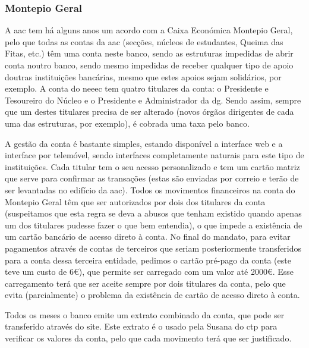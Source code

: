 
\subsubsection{Montepio Geral}

A \acrshort{aac} tem há alguns anos um acordo com a Caixa Económica Montepio Geral, pelo que todas as contas da \acrshort{aac} (secções, núcleos de estudantes, Queima das Fitas, etc.) têm uma conta neste banco, sendo as estruturas impedidas de abrir conta noutro banco, sendo mesmo impedidas de receber qualquer tipo de apoio doutras instituições bancárias, mesmo que estes apoios sejam solidários, por exemplo. A conta do \acrshort{neeec} tem quatro titulares da conta: o Presidente e Tesoureiro do Núcleo e o Presidente e Administrador da \acrshort{dg}. Sendo assim, sempre que um destes titulares precisa de ser alterado (novos órgãos dirigentes de cada uma das estruturas, por exemplo), é cobrada uma taxa pelo banco.

A gestão da conta é bastante simples, estando disponível a interface web e a interface por telemóvel, sendo interfaces completamente naturais para este tipo de instituições. Cada titular tem o seu acesso personalizado e tem um cartão matriz que serve para confirmar as transações (estas são enviadas por correio e terão de ser levantadas no edifício da \acrshort{aac}). Todos os movimentos financeiros na conta do Montepio Geral têm que ser autorizados por dois dos titulares da conta (suspeitamos que esta regra se deva a abusos que tenham existido quando apenas um dos titulares pudesse fazer o que bem entendia), o que impede a existência de um cartão bancário de acesso direto à conta. No final do mandato, para evitar pagamentos através de contas de terceiros que seriam posteriormente transferidos para a conta dessa terceira entidade, pedimos o cartão pré-pago da conta (este teve um custo de 6€), que permite ser carregado com um valor até 2000€. Esse carregamento terá que ser aceite sempre por dois titulares da conta, pelo que evita (parcialmente) o problema da existência de cartão de acesso direto à conta.

Todos os meses o banco emite um extrato combinado da conta, que pode ser transferido através do site. Este extrato é o usado pela Susana do \acrshort{ctp} para verificar os valores da conta, pelo que cada movimento terá que ser justificado.
